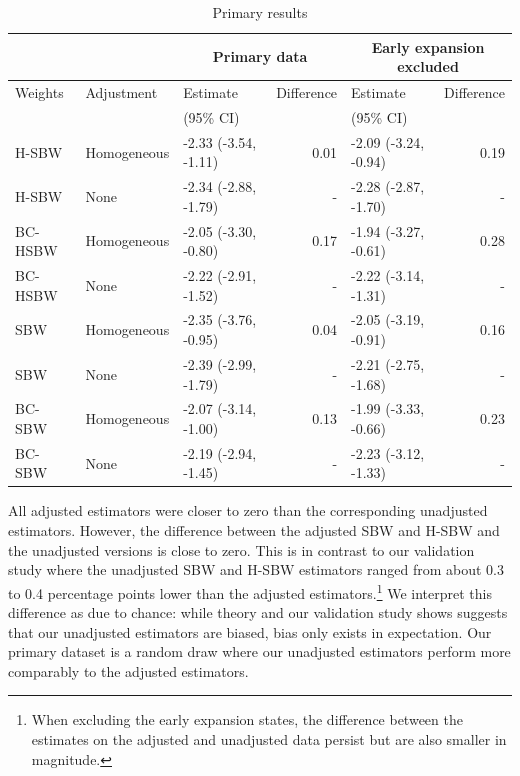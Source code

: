 \documentclass[aoas]{imsart}
\theoremstyle{plain}
\theoremstyle{remark}
\begin{document}
\begin{table}[ht]
\begin{longtable}{lllrlr}\caption{Primary results}\label{tab:mainresults}
 \hline
 &  & \multicolumn{2}{c}{Primary data} & \multicolumn{2}{c}{Early expansion 
 excluded} \\
  \hline
Weights & Adjustment & Estimate  & Difference & Estimate & Difference\\ 
 &  & (95\% CI) &  & (95\% CI) & \\
  \hline
H-SBW & Homogeneous & -2.33 (-3.54, -1.11) & 0.01 & -2.09 (-3.24, -0.94) & 0.19 \\ 
  H-SBW & None & -2.34 (-2.88, -1.79) & - & -2.28 (-2.87, -1.70) & - \\ 
  BC-HSBW & Homogeneous & -2.05 (-3.30, -0.80) & 0.17 & -1.94 (-3.27, -0.61) & 0.28 \\ 
  BC-HSBW & None & -2.22 (-2.91, -1.52) & - & -2.22 (-3.14, -1.31) & - \\ 
  SBW & Homogeneous & -2.35 (-3.76, -0.95) & 0.04 & -2.05 (-3.19, -0.91) & 0.16 \\ 
  SBW & None & -2.39 (-2.99, -1.79) & - & -2.21 (-2.75, -1.68) & - \\ 
  BC-SBW & Homogeneous & -2.07 (-3.14, -1.00) & 0.13 & -1.99 (-3.33, -0.66) & 0.23 \\ 
  BC-SBW & None & -2.19 (-2.94, -1.45) & - & -2.23 (-3.12, -1.33) & - \\    \hline
\end{longtable}
\end{table}

All adjusted estimators were closer to zero than the corresponding unadjusted estimators. However, the difference between the adjusted SBW and H-SBW and the unadjusted versions is close to zero. This is in contrast to our validation study where the unadjusted SBW and H-SBW estimators ranged from about 0.3 to 0.4 percentage points lower than the adjusted estimators.\footnote{When excluding the early expansion states, the difference between the estimates on the adjusted and unadjusted data persist but are also smaller in magnitude.} We interpret this difference as due to chance: while theory and our validation study shows suggests that our unadjusted estimators are biased, bias only exists in expectation. Our primary dataset is a random draw where our unadjusted estimators perform more comparably to the adjusted estimators.
\end{document}

